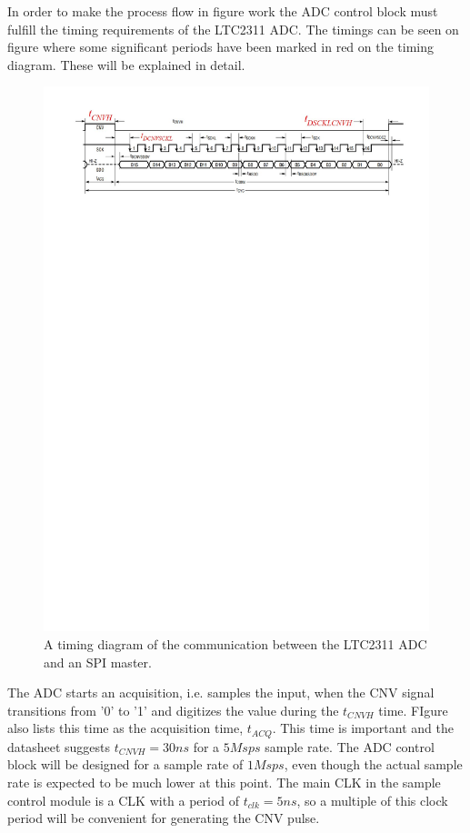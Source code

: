 In order to make the process flow in figure  work the ADC control block must fulfill the timing requirements of the LTC2311 ADC. The timings can be seen on figure  where some significant periods have been marked in red on the timing diagram. These will be explained in detail. 

\begin{figure}[H]
    \centering
    \includegraphics[clip, trim=0 675 0 0, width=1\textwidth]{Sections/7_SystemDesign/Figures/7_2_8_LTC2311_TIMING.pdf}
    \caption{A timing diagram of the communication between the LTC2311 ADC and an SPI master.}
    \label{fig:7_2_8_LTC2311_TIMING}
\end{figure}

The ADC starts an acquisition, i.e. samples the input, when the CNV signal transitions from '0' to '1' and digitizes the value during the $t_{CNVH}$ time. FIgure  also lists this time as the acquisition time, $t_{ACQ}$. This time is important and the datasheet suggests $t_{CNVH} = 30 ns$ for a $5M sps$ sample rate. The ADC control block will be designed for a sample rate of $1 Msps$, even though the actual sample rate is expected to be much lower at this point. The main CLK in the sample control module is a  CLK with a period of $t_{clk} = 5 ns$, so a multiple of this clock period will be convenient for generating the CNV pulse.

